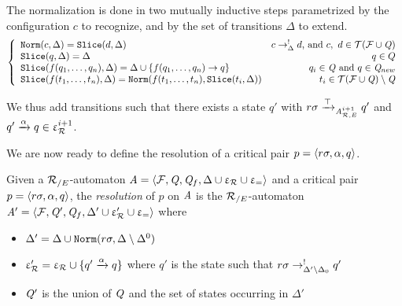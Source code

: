 



\begin{definition}[Normalization]
  \label{def:normalization}
  The normalization is done in two mutually inductive steps
  parametrized by the configuration $c$ to recognize, and by the set
  of transitions $\Delta$ to extend.
  \[
  \left\{
    \begin{array}{lr}
      \mathtt{Norm}(c , \Delta) = \mathtt{Slice}(d, \Delta) & c \rightarrow^!_\Delta d\textrm{, and }c,\ d \in \mathcal{ T(F \cup \mathit Q)}\\
      \mathtt{Slice}(q,\Delta) = \Delta & q \in Q\\
      \mathtt{Slice}(f(q_1,\dots, q_n), \Delta) = \Delta \cup \{f(q_1,\dots, q_n) \rightarrow q\} & q_i \in \mathit Q\textrm{ and }q \in \mathit Q_{new}\\
      \mathtt{Slice}(f(t_1,\dots, t_n), \Delta) = \mathtt{Norm}(f(t_1,\dots, t_n), \mathtt{Slice}(t_i, \Delta)) & t_i \in \mathcal{ T(F \cup \mathit Q)} \setminus \mathit Q\\
    \end{array}
  \right.
  \]
\end{definition}

\noindent
We thus add transitions such that there exists a state $q'$ with
$r\sigma \xrightarrow{\top}_{{\it A}_{\mathcal R,E}^{i+1}} q'$ and $q'\xrightarrow{\alpha} q \in
\upvarepsilon_{\mathcal R}^{i+1}$. 

We are now ready to define the resolution of a critical pair $p=\langle
r\sigma, \alpha, q\rangle$. 

\begin{definition}
\label{def:resolution_cp}
Given a ${\mathcal R_{/E}}$-automaton $\mathit A=\langle \mathcal{F}, \mathit Q, \mathit Q_f, \Delta\cup \upvarepsilon_{\mathcal R}\cup \upvarepsilon_{=}\rangle$ and a critical
pair $p=\langle r\sigma, \alpha, q \rangle$, the {\em resolution} of $p$ on $\mathit A$ is the
${\mathcal R_{/E}}$-automaton $\mathit A'=\langle \mathcal{F}, \mathit Q', \mathit Q_f, \Delta'\cup \upvarepsilon_{\mathcal R}'\cup \upvarepsilon_{=} \rangle$ where
\begin{itemize}
\item $\Delta'= \Delta \cup \mathtt{Norm}(r\sigma,\Delta\setminus \Delta^0)$
\item $\upvarepsilon_{\mathcal R}'= \upvarepsilon_{\mathcal R} \cup \{q' \xrightarrow{\alpha} q\}$ where $q'$ is the state such that $r\sigma
  \rightarrow^!_{\Delta'\setminus \Delta_0} q'$
\item $\mathit Q'$ is the union of $\mathit Q$ and the set of states occurring in $\Delta'$
\end{itemize}
\end{definition}

